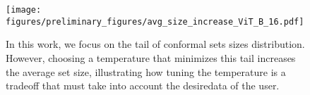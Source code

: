 \begin{figure}[t]
    \centering
    \texttt{[image: figures/preliminary\_figures/avg\_size\_increase\_ViT\_B\_16.pdf]}
    \caption{In this work, we focus on the tail of conformal sets sizes distribution. However, choosing a temperature that minimizes this tail increases the average set size, illustrating how tuning the temperature is a tradeoff that must take into account the desiredata of the user.}
    \label{fig:mean_loss}
\end{figure}